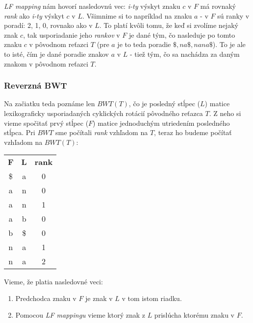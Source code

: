     \emph{LF mapping} nám hovorí nasledovnú vec: \emph{i-ty} výskyt znaku $c$ v $F$ má rovnaký \emph{rank} ako \emph{i-ty} výskyt $c$ v $L$. Všimnime si to napríklad na znaku $a$ - v $F$ sú ranky v poradí: 2, 1, 0, rovnako ako v $L$. To platí kvôli tomu, že keď si zvolíme nejaký znak $c$, tak usporiadanie jeho \emph{rankov} v $F$ je dané tým, čo nasleduje po tomto znaku $c$ v pôvodnom reťazci $T$ (pre $a$ je to teda poradie $\$, na\$, nana\$$). To je ale to isté, čím je dané poradie znakov $a$ v $L$ - tiež tým, čo sa nachádza za daným znakom v pôvodnom reťazci $T$.
    
    \subsubsection{Reverzná BWT}
    
        
     Na začiatku teda poznáme len $BWT(T)$, čo je posledný stĺpec ($L$) matice lexikograficky usporiadaných cyklických rotácií pôvodného reťazca $T$. Z neho si vieme spočitať prvý stĺpec ($F$) matice jednoduchým utriedením posledného stĺpca. Pri $BWT$ sme počítali \emph{rank} vzhľadom na $T$, teraz ho budeme počítať vzhľadom na $BWT(T)$:
    
    \bigskip
    
    \begin{center}
        \begin{tabular}{ c c c }
            \textbf{F}   & \textbf{L} & \textbf{rank} \\  
            \$           & a          & 0             \\
            a            & n          & 0             \\
            a            & n          & 1             \\
            a            & b          & 0             \\
            b            & \$         & 0             \\
            n            & a          & 1             \\
            n            & a          & 2             \\
        \end{tabular}
    \end{center}
    
    \bigskip
    
    Vieme, že platia nasledovné veci:
    
    \begin{enumerate}
        \item{Predchodca znaku v $F$ je znak v $L$ v tom istom riadku.}
        \item{Pomocou \emph{LF mappingu} vieme ktorý znak z $L$ prislúcha ktorému znaku v $F$.}
    \end{enumerate}
    
